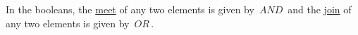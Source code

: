 In the booleans, the \hyperref[D1.81]{meet} of any two elements is given by \,$AND$\, and the \hyperref[D1.81]{join} of any two elements is given by \,$OR$\,.